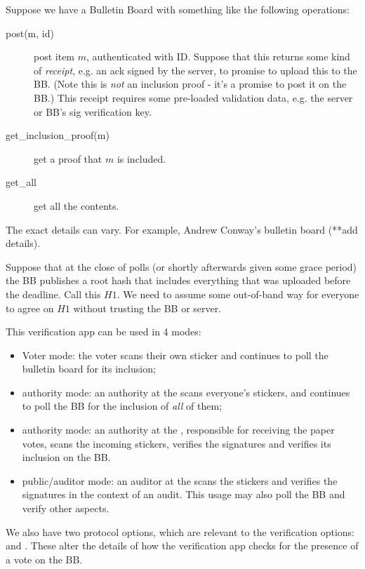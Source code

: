 \documentclass{article}
\begin{document}
Suppose we have a Bulletin Board with something like the following operations:
    \begin{description}
        \item[post(m, id)] post item $m$, authenticated with ID. Suppose that this returns some kind of \emph{receipt}, e.g. an ack signed by the server, to promise to upload this to the BB. (Note this is \emph{not} an inclusion proof - it's a promise to post it on the BB.) This receipt requires some pre-loaded validation data, e.g. the server or BB's sig verification key.
        \item[get\_inclusion\_proof(m)] get a proof that $m$ is included.
        \item[get\_all] get all the contents.
    \end{description}
    The exact details can vary. For example, Andrew Conway's bulletin board (**add details).

    Suppose that at the close of polls (or shortly afterwards given some grace period) the BB publishes a root hash that includes everything that was uploaded before the deadline. Call this $H1$. We need to assume some out-of-band way for everyone to agree on $H1$ without trusting the BB or server.



    This verification app can be used in 4 modes:
    \begin{itemize}
        \item Voter mode: the voter scans their own sticker and continues to poll the bulletin board for its inclusion;
        \item \remoteVotingCenter{} authority mode: an authority at the \remoteVotingCenter{} scans everyone's stickers, and continues to poll the BB for the inclusion of \emph{all} of them;
        \item \localVotingCenter{} authority mode: an authority at the \localVotingCenter{}, responsible for receiving the paper votes, scans the incoming stickers, verifies the signatures and verifies its inclusion on the BB.
        \item \localVotingCenter{} public/auditor mode: an auditor at the \localVotingCenter{} scans the stickers and verifies the signatures in the context of an audit. This usage may also poll the BB and verify other aspects.
    \end{itemize}

    We also have two protocol options, which are relevant to the verification options:
    \BBInclusionCheck{} and \StickerBBUpload{}. These alter the details of how the verification app checks for the presence of a vote on the BB.
\end{document}
